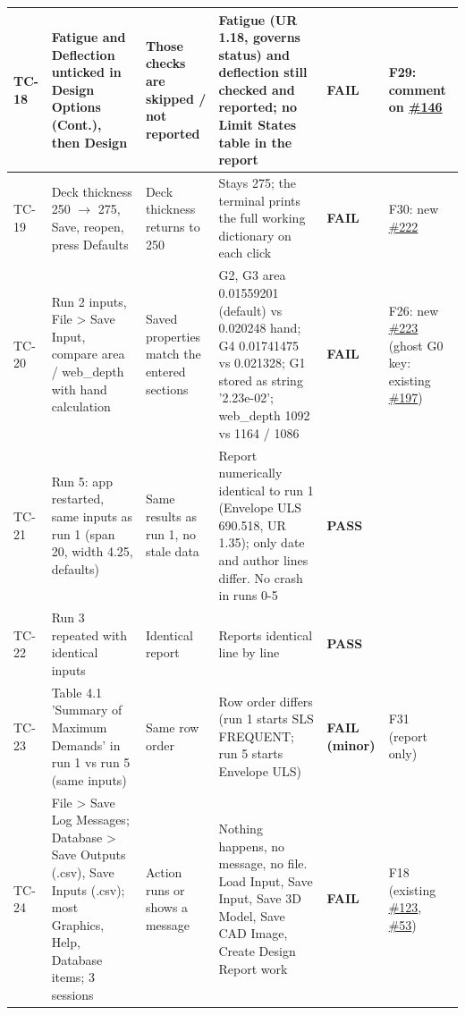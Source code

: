 \documentclass[10pt,a4paper]{article}
\begin{document}
{\begin{longtable}{|p{1.2cm}|p{6.2cm}|p{3.6cm}|p{7.2cm}|p{1.8cm}|p{3.6cm}|}
TC-18 & Fatigue and Deflection unticked in Design Options (Cont.), then Design & Those checks are skipped / not reported & Fatigue (UR 1.18, governs status) and deflection still checked and reported; no Limit States table in the report & \textcolor{failc}{\textbf{FAIL}} & F29: comment on \href{https://github.com/Nidhikhare12/OsdagBridge/issues/146}{\#146} \\ \hline
TC-19 & Deck thickness 250 $\rightarrow$ 275, Save, reopen, press Defaults & Deck thickness returns to 250 & Stays 275; the terminal prints the full working dictionary on each click & \textcolor{failc}{\textbf{FAIL}} & F30: new \href{https://github.com/Nidhikhare12/OsdagBridge/issues/222}{\#222} \\ \hline
TC-20 & Run 2 inputs, File > Save Input, compare area / web\_depth with hand calculation & Saved properties match the entered sections & G2, G3 area 0.01559201 (default) vs 0.020248 hand; G4 0.01741475 vs 0.021328; G1 stored as string '2.23e-02'; web\_depth 1092 vs 1164 / 1086 & \textcolor{failc}{\textbf{FAIL}} & F26: new \href{https://github.com/Nidhikhare12/OsdagBridge/issues/223}{\#223} (ghost G0 key: existing \href{https://github.com/Nidhikhare12/OsdagBridge/issues/197}{\#197}) \\ \hline
TC-21 & Run 5: app restarted, same inputs as run 1 (span 20, width 4.25, defaults) & Same results as run 1, no stale data & Report numerically identical to run 1 (Envelope ULS 690.518, UR 1.35); only date and author lines differ. No crash in runs 0-5 & \textcolor{passc}{\textbf{PASS}} &  \\ \hline
TC-22 & Run 3 repeated with identical inputs & Identical report & Reports identical line by line & \textcolor{passc}{\textbf{PASS}} &  \\ \hline
TC-23 & Table 4.1 'Summary of Maximum Demands' in run 1 vs run 5 (same inputs) & Same row order & Row order differs (run 1 starts SLS FREQUENT; run 5 starts Envelope ULS) & \textcolor{failc}{\textbf{FAIL (minor)}} & F31 (report only) \\ \hline
TC-24 & File > Save Log Messages; Database > Save Outputs (.csv), Save Inputs (.csv); most Graphics, Help, Database items; 3 sessions & Action runs or shows a message & Nothing happens, no message, no file. Load Input, Save Input, Save 3D Model, Save CAD Image, Create Design Report work & \textcolor{failc}{\textbf{FAIL}} & F18 (existing \href{https://github.com/Nidhikhare12/OsdagBridge/issues/123}{\#123}, \href{https://github.com/Nidhikhare12/OsdagBridge/issues/53}{\#53}) \\ \hline

\end{longtable}}
\end{document}
